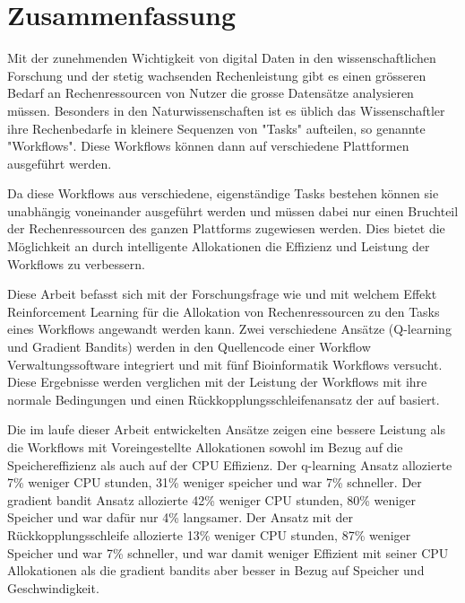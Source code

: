 \section*{Zusammenfassung}

Mit der zunehmenden Wichtigkeit von digital Daten in den wissenschaftlichen Forschung und der stetig wachsenden Rechenleistung gibt es einen grösseren Bedarf an Rechenressourcen von Nutzer die grosse Datensätze analysieren müssen. Besonders in den Naturwissenschaften ist es üblich das Wissenschaftler ihre Rechenbedarfe in kleinere Sequenzen von "Tasks" aufteilen, so genannte "Workflows". Diese Workflows können dann auf verschiedene Plattformen ausgeführt werden.

Da diese Workflows aus verschiedene, eigenständige Tasks bestehen können sie unabhängig voneinander ausgeführt werden und müssen dabei nur einen Bruchteil der Rechenressourcen des ganzen Plattforms zugewiesen werden. Dies bietet die Möglichkeit an durch intelligente Allokationen die Effizienz und Leistung der Workflows zu verbessern. 

Diese Arbeit befasst sich mit der Forschungsfrage wie und mit welchem Effekt Reinforcement Learning für die Allokation von Rechenressourcen zu den Tasks eines Workflows angewandt werden kann. Zwei verschiedene Ansätze (Q-learning und Gradient Bandits) werden in den Quellencode einer Workflow Verwaltungssoftware integriert und mit fünf Bioinformatik Workflows versucht. Diese Ergebnisse werden verglichen mit der Leistung der Workflows mit ihre normale Bedingungen und einen Rückkopplungsschleifenansatz der auf \cite{tovarjob,FeedbackBasedAllocation} basiert.

Die im laufe dieser Arbeit entwickelten Ansätze zeigen eine bessere Leistung als die Workflows mit Voreingestellte Allokationen sowohl im Bezug auf die Speichereffizienz als auch auf der CPU Effizienz. Der q-learning Ansatz allozierte 7\% weniger CPU stunden, 31\% weniger speicher und war 7\% schneller. Der gradient bandit Ansatz allozierte 42\% weniger CPU stunden, 80\% weniger Speicher und war dafür nur 4\% langsamer. Der Ansatz mit der Rückkopplungsschleife allozierte 13\% weniger CPU stunden, 87\% weniger Speicher und war 7\% schneller, und war damit weniger Effizient mit seiner CPU Allokationen als die gradient bandits aber besser in Bezug auf Speicher und Geschwindigkeit.


